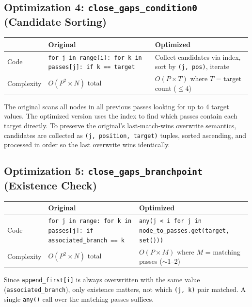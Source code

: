 \documentclass[11pt,a4paper]{article}
\begin{document}
\subsection{Optimization 4: \texttt{close\_gaps\_condition0} (Candidate Sorting)}

\begin{table}[H]
\centering
\begin{tabularx}{\textwidth}{lXX}
\toprule
& \textbf{Original} & \textbf{Optimized} \\
\midrule
Code & \texttt{for j in range(i): for k in passes[j]: if k == target} & Collect candidates via index, sort by \texttt{(j, pos)}, iterate \\
Complexity & $O(P^2 \times N)$ total & $O(P \times T)$ where $T$ = target count ($\leq 4$) \\
\bottomrule
\end{tabularx}
\end{table}

The original scans all nodes in all previous passes looking for up to 4 target values. The optimized version uses the index to find which passes contain each target directly. To preserve the original's last-match-wins overwrite semantics, candidates are collected as \texttt{(j, position, target)} tuples, sorted ascending, and processed in order so the last overwrite wins identically.

\subsection{Optimization 5: \texttt{close\_gaps\_branchpoint} (Existence Check)}

\begin{table}[H]
\centering
\begin{tabularx}{\textwidth}{lXX}
\toprule
& \textbf{Original} & \textbf{Optimized} \\
\midrule
Code & \texttt{for j in range: for k in passes[j]: if associated\_branch == k} & \texttt{any(j < i for j in node\_to\_passes.get(target, set()))} \\
Complexity & $O(P^2 \times N)$ total & $O(P \times M)$ where $M$ = matching passes ($\sim$1--2) \\
\bottomrule
\end{tabularx}
\end{table}

Since \texttt{append\_first[i]} is always overwritten with the same value (\texttt{associated\_branch}), only existence matters, not which \texttt{(j, k)} pair matched. A single \texttt{any()} call over the matching passes suffices.
\end{document}
